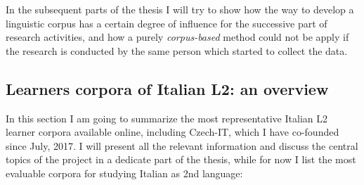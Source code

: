\documentclass[
  a4paper,
  twoside,
  12pt,
  chapterprefix=false,
  bibliography=totocnumbered,
  listof=flat]{scrbook}
\begin{document}
In the subsequent parts of the thesis I will try to show how the way to develop a linguistic corpus has a certain degree of influence for the successive part of research activities, and how a purely \emph{corpus-based} method could not be apply if the research is conducted by the same person which started to collect the data.

\hypertarget{learners-corpora-of-italian-l2-an-overview}{%
\subsection{Learners corpora of Italian L2: an overview}\label{learners-corpora-of-italian-l2-an-overview}}

In this section I am going to summarize the most representative Italian L2 learner corpora available online, including Czech-IT, which I have co-founded since July, 2017. I will present all the relevant information and discuss the central topics of the project in a dedicate part of the thesis, while for now I list the most evaluable corpora for studying Italian as 2nd language:
\end{document}
